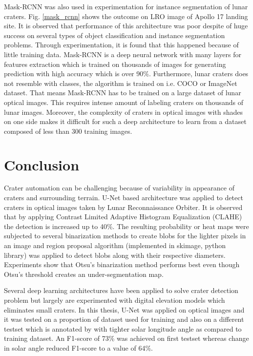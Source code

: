 \documentclass[11pt]{article}
\begin{document}
Mask-RCNN was also used in experimentation for instance segmentation of lunar craters. Fig. \ref{mask_rcnn} shows the outcome on LRO image of Apollo 17 landing site. It is observed that performance of this architecture was poor despite of huge success on several types of object classification and instance segmentation problems. Through experimentation, it is found that this happened because of little training data. Mask-RCNN is a deep neural network with many layers for features extraction which is trained on thousands of images for generating prediction with high accuracy which is over 90\%. Furthermore, lunar craters does not resemble with classes, the algorithm is trained on i.e. COCO or ImageNet dataset. That means Mask-RCNN has to be trained on a large dataset of lunar optical images. This requires intense amount of labeling craters on thousands of lunar images. Moreover, the complexity of craters in optical images with shades on one side makes it difficult for such a deep architecture to learn from a dataset composed of less than 300 training images.

\section{Conclusion}
Crater automation can be challenging because of variability in appearance of craters and surrounding terrain. U-Net based architecture was applied to detect craters in optical images taken by Lunar Reconnaissance Orbiter. It is observed that by applying Contrast Limited Adaptive Histogram Equalization (CLAHE) the detection is increased up to 40\%. The resulting probability or heat maps were subjected to several binarization methods to create blobs for the lighter pixels in an image and region proposal algorithm (implemented in skimage, python library) was applied to detect blobs along with their respective diameters. Experiments show that Otsu's binarization method performs best even though Otsu's threshold creates an under-segmentation map. 

Several deep learning architectures have been applied to solve crater detection problem but largely are experimented with digital elevation models which eliminates small craters. In this thesis, U-Net was applied on optical images and it was tested on a proportion of dataset used for training and also on a different testset which is annotated by \cite{dino2020} with tighter solar longitude angle as compared to training dataset. An F1-score of 73\% was achieved on first testset whereas change in solar angle reduced F1-score to a value of 64\%.
\end{document}
